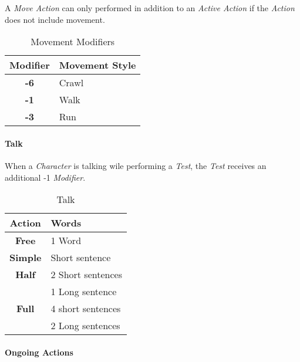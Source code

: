 A \emph{Move Action} can only performed in addition to an \emph{Active Action}
if the \emph{Action} does not include movement.

\begin{table}[htb]
    \caption[Movement Modifiers]{Movement Modifiers}
    \label{tab:movement modifiers}
    \centering
    \begin{tabular}{cl}
        \toprule
        \textbf{Modifier} & \textbf{Movement Style} \\
        \midrule
        \textbf{-6}       & Crawl                   \\
        \textbf{-1}       & Walk                    \\
        \textbf{-3}       & Run                     \\
        \bottomrule
    \end{tabular}
\end{table}

\paragraph{Talk}

When a \emph{Character} is talking wile performing a \emph{Test}, the \emph{Test}
receives an additional -1 \emph{Modifier}.
\begin{table}[htb]
    \caption[Talk]{Talk}
    \label{tab:talk}
    \centering
    \begin{tabular}{cl}
        \toprule
        \textbf{Action} & \textbf{Words}    \\
        \midrule
        \textbf{Free}   & 1 Word            \\
        \textbf{Simple} & Short sentence    \\
        \textbf{Half}   & 2 Short sentences \\
                        & 1 Long sentence   \\
        \textbf{Full}   & 4 short sentences \\
                        & 2 Long sentences  \\
        \bottomrule
    \end{tabular}
\end{table}

\paragraph{Ongoing Actions}

